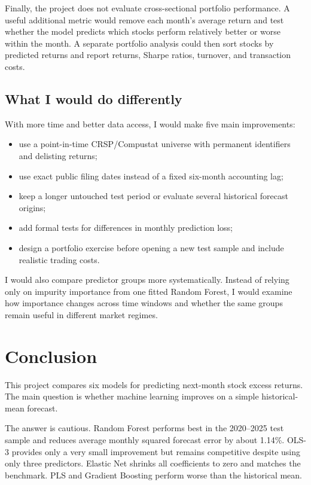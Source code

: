 \documentclass[11pt,a4paper]{article}
\begin{document}
Finally, the project does not evaluate cross-sectional portfolio performance.
A useful additional metric would remove each month's average return and test
whether the model predicts which stocks perform relatively better or worse
within the month. A separate portfolio analysis could then sort stocks by
predicted returns and report returns, Sharpe ratios, turnover, and transaction
costs.

\subsection{What I would do differently}

With more time and better data access, I would make five main improvements:

\begin{itemize}
  \item use a point-in-time CRSP/Compustat universe with permanent identifiers and delisting returns;
  \item use exact public filing dates instead of a fixed six-month accounting lag;
  \item keep a longer untouched test period or evaluate several historical forecast origins;
  \item add formal tests for differences in monthly prediction loss;
  \item design a portfolio exercise before opening a new test sample and include realistic trading costs.
\end{itemize}

I would also compare predictor groups more systematically. Instead of relying
only on impurity importance from one fitted Random Forest, I would examine how
importance changes across time windows and whether the same groups remain useful
in different market regimes.

\section{Conclusion}
\label{sec:conclusion}

This project compares six models for predicting next-month stock excess
returns. The main question is whether machine learning improves on a simple
historical-mean forecast.

The answer is cautious. Random Forest performs best in the 2020--2025 test
sample and reduces average monthly squared forecast error by about 1.14\%.
OLS-3 provides only a very small improvement but remains competitive despite
using only three predictors. Elastic Net shrinks all coefficients to zero and
matches the benchmark. PLS and Gradient Boosting perform worse than the
historical mean.
\end{document}
